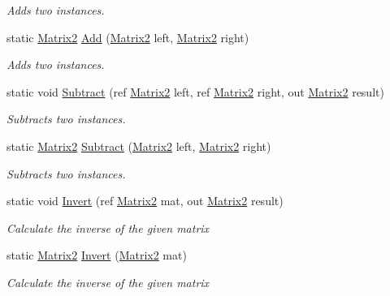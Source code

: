 \begin{DoxyCompactItemize}
\begin{DoxyCompactList}\small\item\em Adds two instances. \end{DoxyCompactList}\item 
static \hyperlink{struct_open_t_k_1_1_matrix2}{Matrix2} \hyperlink{struct_open_t_k_1_1_matrix2_ae7f21701779660ec4e7db6ad2fa9792c}{Add} (\hyperlink{struct_open_t_k_1_1_matrix2}{Matrix2} left, \hyperlink{struct_open_t_k_1_1_matrix2}{Matrix2} right)
\begin{DoxyCompactList}\small\item\em Adds two instances. \end{DoxyCompactList}\item 
static void \hyperlink{struct_open_t_k_1_1_matrix2_a1f88c61e7a7f8e8bbc6bea2d52a279e7}{Subtract} (ref \hyperlink{struct_open_t_k_1_1_matrix2}{Matrix2} left, ref \hyperlink{struct_open_t_k_1_1_matrix2}{Matrix2} right, out \hyperlink{struct_open_t_k_1_1_matrix2}{Matrix2} result)
\begin{DoxyCompactList}\small\item\em Subtracts two instances. \end{DoxyCompactList}\item 
static \hyperlink{struct_open_t_k_1_1_matrix2}{Matrix2} \hyperlink{struct_open_t_k_1_1_matrix2_a0183133151489936c9b39a80cf5296c5}{Subtract} (\hyperlink{struct_open_t_k_1_1_matrix2}{Matrix2} left, \hyperlink{struct_open_t_k_1_1_matrix2}{Matrix2} right)
\begin{DoxyCompactList}\small\item\em Subtracts two instances. \end{DoxyCompactList}\item 
static void \hyperlink{struct_open_t_k_1_1_matrix2_a43785f5b085a1777b5aac98e2f6fcff8}{Invert} (ref \hyperlink{struct_open_t_k_1_1_matrix2}{Matrix2} mat, out \hyperlink{struct_open_t_k_1_1_matrix2}{Matrix2} result)
\begin{DoxyCompactList}\small\item\em Calculate the inverse of the given matrix \end{DoxyCompactList}\item 
static \hyperlink{struct_open_t_k_1_1_matrix2}{Matrix2} \hyperlink{struct_open_t_k_1_1_matrix2_abd0852c064e9348daebba6c4f0b96000}{Invert} (\hyperlink{struct_open_t_k_1_1_matrix2}{Matrix2} mat)
\begin{DoxyCompactList}\small\item\em Calculate the inverse of the given matrix \end{DoxyCompactList}\item 

\end{DoxyCompactItemize}
